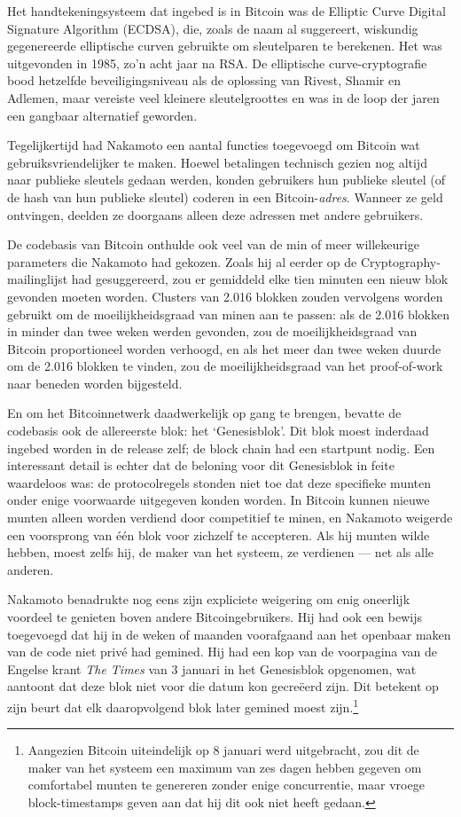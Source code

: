 \documentclass[
  a5paper,
  smalldemyvopaper,11pt,twoside,onecolumn,openright,extrafontsizes]{memoir}
\begin{document}
Het handtekeningsysteem dat ingebed is in Bitcoin was de Elliptic Curve
Digital Signature Algorithm (ECDSA), die, zoals de naam al suggereert,
wiskundig gegenereerde elliptische curven gebruikte om sleutelparen te
berekenen. Het was uitgevonden in 1985, zo'n acht jaar na RSA. De
elliptische curve-cryptografie bood hetzelfde beveiligingsniveau als de
oplossing van Rivest, Shamir en Adlemen, maar vereiste veel kleinere
sleutelgroottes en was in de loop der jaren een gangbaar alternatief
geworden.

Tegelijkertijd had Nakamoto een aantal functies toegevoegd om Bitcoin
wat gebruiksvriendelijker te maken. Hoewel betalingen technisch gezien
nog altijd naar publieke sleutels gedaan werden, konden gebruikers hun
publieke sleutel (of de hash van hun publieke sleutel) coderen in een
Bitcoin-\emph{adres}. Wanneer ze geld ontvingen, deelden ze doorgaans
alleen deze adressen met andere gebruikers.

De codebasis van Bitcoin onthulde ook veel van de min of meer
willekeurige parameters die Nakamoto had gekozen. Zoals hij al eerder op
de Cryptography-mailinglijst had gesuggereerd, zou er gemiddeld elke
tien minuten een nieuw blok gevonden moeten worden. Clusters van 2.016
blokken zouden vervolgens worden gebruikt om de moeilijkheidsgraad van
minen aan te passen: als de 2.016 blokken in minder dan twee weken
werden gevonden, zou de moeilijkheidsgraad van Bitcoin proportioneel
worden verhoogd, en als het meer dan twee weken duurde om de 2.016
blokken te vinden, zou de moeilijkheidsgraad van het proof-of-work naar
beneden worden bijgesteld.

En om het Bitcoinnetwerk daadwerkelijk op gang te brengen, bevatte de
codebasis ook de allereerste blok: het `Genesisblok'. Dit blok moest
inderdaad ingebed worden in de release zelf; de block chain had een
startpunt nodig. Een interessant detail is echter dat de beloning voor
dit Genesisblok in feite waardeloos was: de protocolregels stonden niet
toe dat deze specifieke munten onder enige voorwaarde uitgegeven konden
worden. In Bitcoin kunnen nieuwe munten alleen worden verdiend door
competitief te minen, en Nakamoto weigerde een voorsprong van één blok
voor zichzelf te accepteren. Als hij munten wilde hebben, moest zelfs
hij, de maker van het systeem, ze verdienen --- net als alle anderen.

Nakamoto benadrukte nog eens zijn expliciete weigering om enig oneerlijk
voordeel te genieten boven andere Bitcoingebruikers. Hij had ook een
bewijs toegevoegd dat hij in de weken of maanden voorafgaand aan het
openbaar maken van de code niet privé had gemined. Hij had een kop van
de voorpagina van de Engelse krant \emph{The Times} van 3 januari in het
Genesisblok opgenomen, wat aantoont dat deze blok niet voor die datum
kon gecreëerd zijn. Dit betekent op zijn beurt dat elk daaropvolgend
blok later gemined moest zijn.\footnote{Aangezien Bitcoin uiteindelijk
  op 8 januari werd uitgebracht, zou dit de maker van het systeem een
  maximum van zes dagen hebben gegeven om comfortabel munten te
  genereren zonder enige concurrentie, maar vroege block-timestamps
  geven aan dat hij dit ook niet heeft gedaan.}
\end{document}
